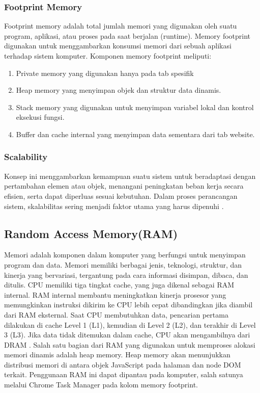 \subsubsection{Footprint Memory}
Footprint memory adalah total jumlah memori yang digunakan oleh suatu program, aplikasi, atau proses pada saat berjalan (runtime). Memory footprint digunakan untuk menggambarkan konsumsi memori dari sebuah aplikasi terhadap sistem komputer. Komponen memory footprint meliputi:
\begin{enumerate}
	\item Private memory yang digunakan hanya pada tab spesifik 
	\item Heap memory yang menyimpan objek dan struktur data dinamis.
	\item Stack memory yang digunakan untuk menyimpan variabel lokal dan kontrol eksekusi fungsi.
	\item Buffer dan cache internal yang menyimpan data sementara dari tab website.
\end{enumerate}

\subsubsection{Scalability}
Konsep ini menggambarkan kemampuan suatu sistem untuk beradaptasi dengan pertambahan elemen atau objek, menangani peningkatan beban kerja secara efisien, serta dapat diperluas sesuai kebutuhan. Dalam proses perancangan sistem, skalabilitas sering menjadi faktor utama yang harus dipenuhi \cite{Bondi2000}.

\subsection{Random Access Memory(RAM)}
Memori adalah komponen dalam komputer yang berfungsi untuk menyimpan program dan data. Memori memiliki berbagai jenis, teknologi, struktur, dan kinerja yang bervariasi, tergantung pada cara informasi disimpan, dibaca, dan ditulis. CPU memiliki tiga tingkat cache, yang juga dikenal sebagai RAM internal. RAM internal membantu meningkatkan kinerja prosesor yang memungkinkan instruksi dikirim ke CPU lebih cepat dibandingkan jika diambil dari RAM eksternal. Saat CPU membutuhkan data, pencarian pertama dilakukan di cache Level 1 (L1), kemudian di Level 2 (L2), dan terakhir di Level 3 (L3). Jika data tidak ditemukan dalam cache, CPU akan mengambilnya dari DRAM \cite{Nurwarsito}. Salah satu bagian dari RAM yang digunakan untuk memproses alokasi memori dinamis adalah heap memory. Heap memory akan menunjukkan distribusi memori di antara objek JavaScript pada halaman dan node DOM terkait. Penggunaan RAM ini dapat dipantau pada komputer, salah satunya melalui Chrome Task Manager pada kolom memory footprint. 

